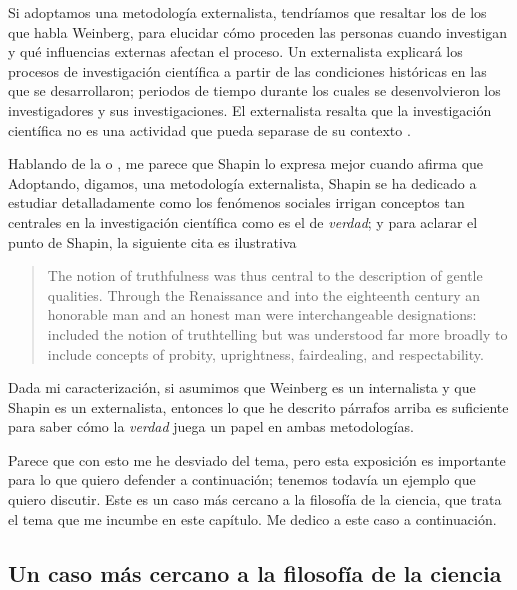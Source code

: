 Si adoptamos una metodología externalista, tendríamos que resaltar los  de los que habla Weinberg, para elucidar cómo proceden las personas cuando investigan y qué influencias externas afectan el proceso.
Un externalista explicará los procesos de investigación científica a partir de las condiciones históricas en las que se desarrollaron; periodos de tiempo durante los cuales se desenvolvieron los investigadores y sus investigaciones.
El externalista resalta que la investigación científica no es una actividad que pueda separase de su contexto .

Hablando de la  o , me parece que Shapin lo expresa mejor cuando afirma que  \parencite[][Capítulo 2]{shapin2010never}
Adoptando, digamos, una metodología externalista, Shapin se ha dedicado a estudiar detalladamente como los fenómenos sociales irrigan conceptos tan centrales en la investigación científica como es el de \emph{verdad}; y para aclarar el punto de Shapin, la siguiente cita es ilustrativa

\begin{quote}
	The notion of truthfulness was thus central to the description of gentle qualities.
	Through the Renaissance and into the eighteenth century an honorable man and an honest man were interchangeable designations:  included the notion of truthtelling but was understood far more broadly to include concepts of probity, uprightness, fairdealing, and respectability. \parencite[][pp. 70-71]{Shapin1995}
\end{quote}

Dada mi caracterización, si asumimos que Weinberg es un internalista y que Shapin es un externalista, entonces lo que he descrito párrafos arriba es suficiente para saber cómo la \emph{verdad} juega un papel en ambas metodologías.

Parece que con esto me he desviado del tema, pero esta exposición es importante para lo que quiero defender a continuación; tenemos todavía un ejemplo que quiero discutir.
Este es un caso más cercano a la filosofía de la ciencia, que trata el tema que me incumbe en este capítulo.
Me dedico a este caso a continuación.

\subsection{Un caso más cercano a la filosofía de la ciencia}
\label{sbc:yturbe}

